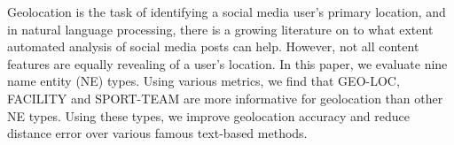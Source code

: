 Geolocation is the task of identifying a social media user's primary location, and in natural language processing, there is a growing literature on to what extent automated analysis of social media posts can help. However, not all content features are equally revealing of a user's location. In this paper, we evaluate nine name entity (NE) types. Using various metrics, we find that GEO-LOC, FACILITY and SPORT-TEAM are more informative for geolocation than other NE types. Using these types, we improve geolocation accuracy and reduce distance error over various famous text-based methods.
